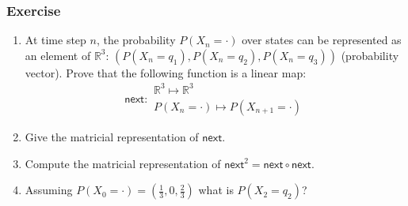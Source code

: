 \documentclass{beamer}
\begin{document}
\begin{frame}
  \frametitle{Exercise}
  \begin{center}
  \end{center}

  \begin{enumerate}
  \item At time step $n$, the probability $P(X_n = \cdot)$ over states can be represented as an element of $\mathbb{R}^3$:  $(P(X_n = q_1), P(X_n = q_2), P(X_n = q_3))$ (probability vector). Prove that the following function is a linear map:
    \[\textsf{next}: \begin{array}{l} \mathbb{R}^3 \mapsto \mathbb{R}^3\\ P(X_n = \cdot) \mapsto P(X_{n+1} = \cdot)   \end{array}   \]
  \item Give the matricial representation of $\textsf{next}$.
  \item Compute the matricial representation of $\textsf{next}^2 = \textsf{next} \circ \textsf{next}$.
  \item Assuming $P(X_0 = \cdot) = (\frac{1}{3}, 0 , \frac{2}{3})$ what is $P(X_2 = q_2)$? 
  \end{enumerate}
\end{frame}
\end{document}
